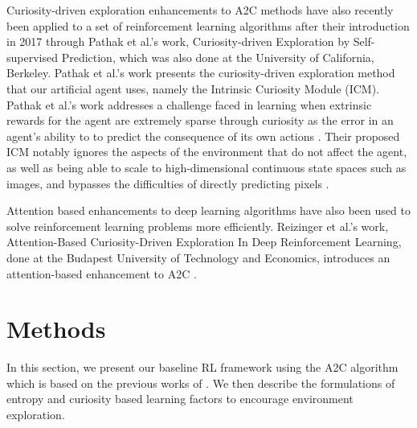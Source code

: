 \documentclass{article}
\begin{document}
Curiosity-driven exploration enhancements to A2C methods have also recently been applied to a set of reinforcement learning algorithms after their introduction in 2017 through Pathak et al.’s work, Curiosity-driven Exploration by Self-supervised Prediction, which was also done at the University of California, Berkeley. Pathak et al.’s work presents the curiosity-driven exploration method that our artificial agent uses, namely the Intrinsic Curiosity Module (ICM). Pathak et al.’s work addresses a challenge faced in learning when extrinsic rewards for the agent are extremely sparse through curiosity as the error in an agent’s ability to to predict the consequence of its own actions \cite{curiosity}. Their proposed ICM notably ignores the aspects of the environment that do not affect the agent, as well as being able to scale to high-dimensional continuous state spaces such as images, and bypasses the difficulties of directly predicting pixels \cite{curiosity}.

Attention based enhancements to deep learning algorithms have also been used to solve reinforcement learning problems more efficiently. Reizinger et al.’s work, Attention-Based Curiosity-Driven Exploration In Deep Reinforcement Learning, done at the Budapest University of Technology and Economics, introduces an attention-based enhancement to A2C \cite{budapest}.


\section{Methods}
In this section, we present our baseline RL framework using the A2C algorithm which is based on the previous works of \cite{a2c}. We then describe the formulations of entropy and curiosity based learning factors to encourage environment exploration.
\end{document}
